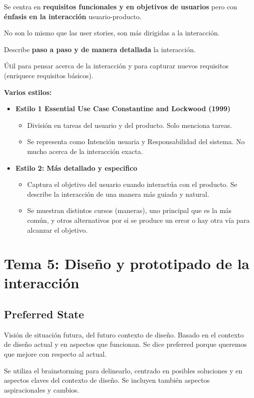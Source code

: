 \documentclass[12pt]{report} %
\begin{document}
Se centra en \textbf{requisitos funcionales y en objetivos de usuarios} pero
con \textbf{énfasis en la interacción} usuario-producto.

No son lo mismo que las user stories, son más dirigidas a la
interacción.

Describe \textbf{paso a paso y de manera detallada} la interacción.

Útil para pensar acerca de la interacción y para capturar nuevos
requisitos (enriquece requisitos básicos).

\textbf{Varios estilos:}

\begin{itemize}
	\item \textbf{Estilo 1 Essential Use Case Constantine and Lockwood (1999)}
		\begin{itemize}
			\item División en tareas del usuario y del producto. Solo menciona tareas.
			\item Se representa como Intención usuaria y Responsabilidad del sistema. No mucho acerca de la interacción exacta.
		\end{itemize}
	\item \textbf{Estilo 2: Más detallado y especifico}
		\begin{itemize}
			\item Captura el objetivo del usuario cuando interactúa con el producto. Se describe la interacción de una manera más guiada y natural.
			\item Se muestran distintos cursos (maneras), uno principal que es la más común, y otros alternativos por si se produce un error o hay otra vía para alcanzar el objetivo.
		\end{itemize}
\end{itemize}

\chapter{Tema 5: Diseño y prototipado de la interacción}

\section{Preferred State}
Visión de situación futura, del futuro contexto de diseño. Basado en el contexto de diseño actual y en aspectos que funcionan. Se dice preferred porque queremos que mejore con respecto al actual.

Se utiliza el brainstorming para delinearlo, centrado en posibles soluciones y en aspectos claves del contexto de diseño. Se incluyen también aspectos aspiracionales y cambios.
\end{document}
